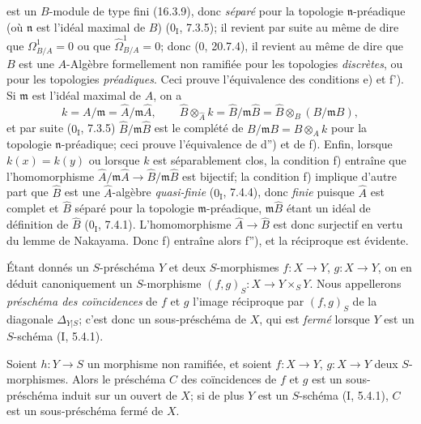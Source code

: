 est un $B$-module de type fini (16.3.9), donc \emph{séparé} pour la topologie $\mathfrak n$-préadique (où $\mathfrak n$ est l'idéal maximal de $B$) ($0_{\mathrm I}$, 7.3.5); il revient par suite au même de dire que $\Omega^1_{B/A}=0$ ou que $\widehat{\Omega}^1_{B/A}=0$; donc (0, 20.7.4), il revient au même de dire que $B$ est une $A$-Algèbre formellement non ramifiée pour les topologies \emph{discrètes}, ou pour les topologies \emph{préadiques}. Ceci prouve l'équivalence des conditions e) et f'). Si $\mathfrak m$ est l'idéal maximal de $A$, on a
\[
k=A/\mathfrak m=\widehat A/\mathfrak m\widehat A,
\qquad
\widehat B\otimes_{\widehat A}k=\widehat B/\mathfrak m\widehat B
=\widehat B\otimes_B(B/\mathfrak m B),
\]
et par suite ($0_{\mathrm I}$, 7.3.5) $\widehat B/\mathfrak m\widehat B$ est le complété de $B/\mathfrak m B=B\otimes_A k$ pour la topologie $\mathfrak n$-préadique; ceci prouve l'équivalence de d'') et de f). Enfin, lorsque $k(x)=k(y)$ ou lorsque $k$ est séparablement clos, la condition f) entraîne que l'homomorphisme $\widehat A/\mathfrak m\widehat A\to\widehat B/\mathfrak m\widehat B$ est bijectif; la condition f) implique d'autre part que $\widehat B$ est une $\widehat A$-algèbre \emph{quasi-finie} ($0_{\mathrm I}$, 7.4.4), donc \emph{finie} puisque $\widehat A$ est complet et $\widehat B$ séparé pour la topologie $\mathfrak m$-préadique, $\mathfrak m\widehat B$ étant un idéal de définition de $\widehat B$ ($0_{\mathrm I}$, 7.4.1). L'homomorphisme $\widehat A\to\widehat B$ est donc surjectif en vertu du lemme de Nakayama. Donc f) entraîne alors f''), et la réciproque est évidente.

\begin{env}[17.4.5]
Étant donnés un $S$-préschéma $Y$ et deux $S$-morphismes $f:X\to Y$, $g:X\to Y$, on en déduit canoniquement un $S$-morphisme $(f,g)_S:X\to Y\times_S Y$. Nous appellerons \emph{préschéma des coïncidences} de $f$ et $g$ l'image réciproque par $(f,g)_S$ de la diagonale $\Delta_{Y|S}$; c'est donc un sous-préschéma de $X$, qui est \emph{fermé} lorsque $Y$ est un $S$-schéma (I, 5.4.1).
\end{env}

\begin{proposition}[17.4.6]
\label{IV.17.4.6}
Soient $h:Y\to S$ un morphisme non ramifiée, et soient $f:X\to Y$, $g:X\to Y$ deux $S$-morphismes. Alors le préschéma $C$ des coïncidences de $f$ et $g$ est un sous-préschéma induit sur un ouvert de $X$; si de plus $Y$ est un $S$-schéma (I, 5.4.1), $C$ est un sous-préschéma fermé de $X$.
\end{proposition}

